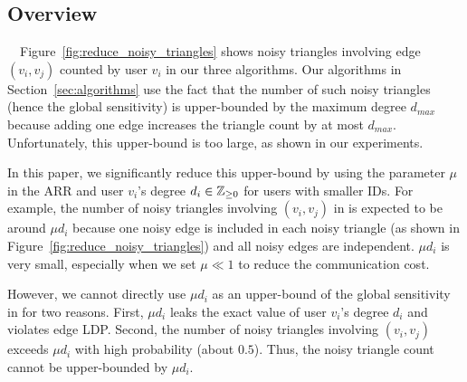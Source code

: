 \subsection{Overview}
\label{sub:clip_overview}

{}~~Figure~\ref{fig:reduce_noisy_triangles} shows noisy triangles involving edge $(v_i,v_j)$ counted by user $v_i$ in our three algorithms. 
Our algorithms in Section~\ref{sec:algorithms} 
use the fact that the number of such noisy triangles (hence the global sensitivity) is upper-bounded by the maximum degree $d_{max}$ because 
adding one edge increases the triangle count by at most $d_{max}$. 
Unfortunately, this upper-bound is too large, as shown in our experiments. 

In this paper, we 
significantly reduce this upper-bound by using the parameter $\mu$ in the ARR and user $v_i$'s degree $d_i \in \mathbb{Z}_{\ge0}$ for users with smaller IDs. 
For example, 
the number of noisy triangles involving $(v_i,v_j)$ in \AlgOne is 
expected to be around 
$\mu d_i$ 
because one noisy edge is included in each noisy triangle (as shown in Figure~\ref{fig:reduce_noisy_triangles}) and all noisy edges are independent. 
$\mu d_i$ is very small, especially when we set $\mu \ll 1$ to reduce the communication cost.  

However, we cannot directly use $\mu d_i$ as an upper-bound of the global sensitivity in \AlgOne for two reasons. 
First, $\mu d_i$ leaks the exact value of user $v_i$'s degree $d_i$ 
and 
violates edge LDP. 
Second, the number of noisy triangles involving $(v_i,v_j)$ exceeds $\mu d_i$ with high probability (about $0.5$). 
Thus, the noisy triangle count cannot be upper-bounded by $\mu d_i$. 

